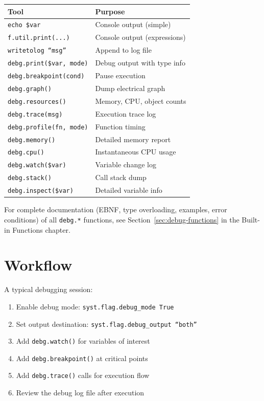 \begin{center}
\begin{tabular}{ll}
Tool & Purpose \\ \hline
\texttt{echo \$var} & Console output (simple) \\
\texttt{f.util.print(...)} & Console output (expressions) \\
\texttt{writetolog ``msg''} & Append to log file \\
\texttt{debg.print(\$var, mode)} & Debug output with type info \\
\texttt{debg.breakpoint(cond)} & Pause execution \\
\texttt{debg.graph()} & Dump electrical graph \\
\texttt{debg.resources()} & Memory, CPU, object counts \\
\texttt{debg.trace(msg)} & Execution trace log \\
\texttt{debg.profile(fn, mode)} & Function timing \\
\texttt{debg.memory()} & Detailed memory report \\
\texttt{debg.cpu()} & Instantaneous CPU usage \\
\texttt{debg.watch(\$var)} & Variable change log \\
\texttt{debg.stack()} & Call stack dump \\
\texttt{debg.inspect(\$var)} & Detailed variable info \\
\end{tabular}
\end{center}

For complete documentation (EBNF, type overloading, examples, error conditions) of all \texttt{debg.*} functions, see Section~\ref{sec:debug-functions} in the Built-in Functions chapter.

\section{Workflow}
A typical debugging session:
\begin{enumerate}
\item Enable debug mode: \texttt{syst.flag.debug\_mode True}
\item Set output destination: \texttt{syst.flag.debug\_output ``both''}
\item Add \texttt{debg.watch()} for variables of interest
\item Add \texttt{debg.breakpoint()} at critical points
\item Add \texttt{debg.trace()} calls for execution flow
\item Review the debug log file after execution
\end{enumerate}




